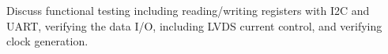 \label{sec:3}

Discuss functional testing including reading/writing registers with I2C and
UART, verifying the data I/O, including LVDS current control, and
verifying clock generation.
